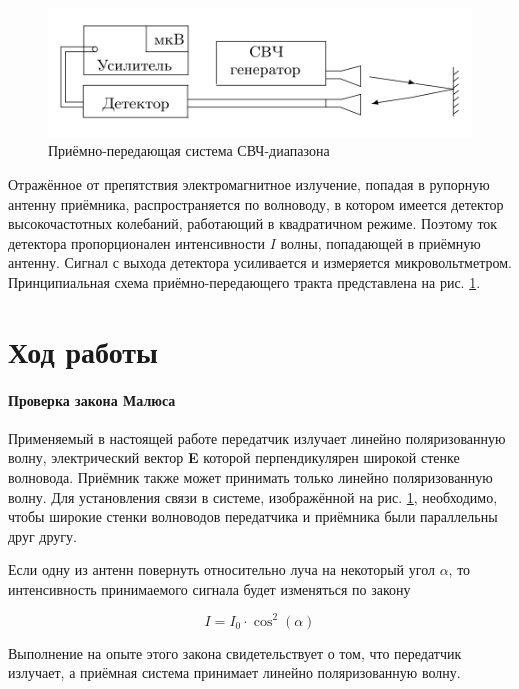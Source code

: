 \documentclass[a4paper, 12pt]{article}
\begin{document}
\begin{figure}[h]
    \centering
    \includegraphics[width=15cm]{reflection.png}
    \caption{Приёмно-передающая система СВЧ-диапазона}
    \label{fig:reflection}
\end{figure}

Отражённое от препятствия электромагнитное излучение, попадая в рупорную антенну приёмника, распространяется по волноводу, в котором имеется детектор высокочастотных колебаний, работающий в квадратичном режиме. Поэтому ток детектора пропорционален интенсивности $I$ волны, попадающей в приёмную антенну. Сигнал с выхода детектора усиливается и измеряется микровольтметром. Принципиальная схема приёмно-передающего тракта представлена на рис. \ref{fig:reflection}.

\newpage

\section*{Ход работы}

\paragraph*{Проверка закона Малюса}

Применяемый в настоящей работе передатчик излучает линейно поляризованную волну, электрический вектор \textbf{E} которой перпендикулярен широкой стенке волновода. Приёмник также может принимать только линейно поляризованную волну. Для установления связи в системе, изображённой на рис. \ref{fig:reflection}, необходимо, чтобы широкие стенки волноводов передатчика и приёмника были параллельны друг другу.

Если одну из антенн повернуть относительно луча на некоторый угол $\alpha$, то интенсивность принимаемого сигнала будет изменяться по закону

$$I = I_0 \cdot \cos^2(\alpha)$$

Выполнение на опыте этого закона свидетельствует о том, что передатчик излучает, а приёмная система принимает линейно поляризованную волну.
\end{document}
